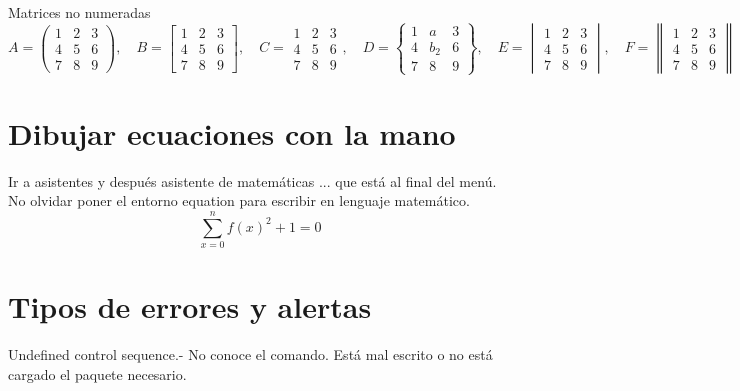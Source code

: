 Matrices no numeradas
\begin{equation*}
	A = 
	\begin{pmatrix}
		1 & 2 & 3 \\
		4 & 5 & 6 \\
		7 & 8 & 9
	\end{pmatrix}, \quad
	B = 
	\begin{bmatrix}
		1 & 2 & 3 \\
		4 & 5 & 6 \\
		7 & 8 & 9
	\end{bmatrix}, \quad
	C = 
	\begin{matrix}
		1 & 2 & 3 \\
		4 & 5 & 6 \\
		7 & 8 & 9
	\end{matrix}, \quad
	D = 
	\begin{Bmatrix}
		1 & a & 3 \\
		4 & b_2 & 6 \\
		7 & 8 & 9
	\end{Bmatrix}, \quad
	E = 
	\begin{vmatrix}
		1 & 2 & 3 \\
		4 & 5 & 6 \\
		7 & 8 & 9
	\end{vmatrix}, \quad
	F = 
	\begin{Vmatrix}
		1 & 2 & 3 \\
		4 & 5 & 6 \\
		7 & 8 & 9
	\end{Vmatrix}
\end{equation*} %

\section{Dibujar ecuaciones con la mano}
Ir a asistentes y después asistente de matemáticas ... que está al final del menú.
No olvidar poner el entorno equation para escribir en lenguaje matemático.
\begin{equation}
	\sum _{x=0}^{n}f{\left(x\right)}^{2}+1=0
\end{equation}

\section{Tipos de errores y alertas}


Undefined control sequence.- No conoce el comando. Está mal escrito o no está cargado el paquete necesario.

